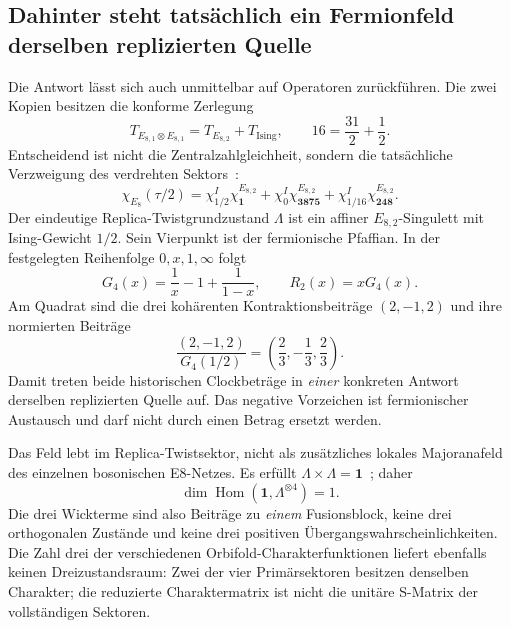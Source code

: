 \subsection{Dahinter steht tatsächlich ein Fermionfeld derselben replizierten Quelle}
Die Antwort lässt sich auch unmittelbar auf Operatoren zurückführen.
Die zwei Kopien besitzen die konforme Zerlegung
\begin{equation}
T_{E_{8,1}\otimes E_{8,1}}
=T_{E_{8,2}}+T_{\mathrm{Ising}},\qquad
16=\frac{31}{2}+\frac12.
\end{equation}
Entscheidend ist nicht die Zentralzahlgleichheit, sondern die tatsächliche Verzweigung des verdrehten Sektors~\cite{collazuolmelnikov}:
\begin{equation}
\chi_{E_8}(\tau/2)
=\chi^I_{1/2}\chi^{E_{8,2}}_{\mathbf1}
+\chi^I_0\chi^{E_{8,2}}_{\mathbf{3875}}
+\chi^I_{1/16}\chi^{E_{8,2}}_{\mathbf{248}}.
\end{equation}
Der eindeutige Replica-Twistgrundzustand $\Lambda$ ist ein affiner $E_{8,2}$-Singulett mit Ising-Gewicht $1/2$. Sein Vierpunkt ist der fermionische Pfaffian. In der festgelegten Reihenfolge $0,x,1,\infty$ folgt
\begin{equation}
G_4(x)=\frac1x-1+\frac1{1-x},\qquad R_2(x)=xG_4(x).
\end{equation}
Am Quadrat sind die drei kohärenten Kontraktionsbeiträge $(2,-1,2)$ und ihre normierten Beiträge
\begin{equation}\label{eq:replicaclockamplitudes}
\frac{(2,-1,2)}{G_4(1/2)}
=\left(\frac23,-\frac13,\frac23\right).
\end{equation}
Damit treten beide historischen Clockbeträge in \emph{einer} konkreten Antwort derselben replizierten Quelle auf. Das negative Vorzeichen ist fermionischer Austausch und darf nicht durch einen Betrag ersetzt werden.

Das Feld lebt im Replica-Twistsektor, nicht als zusätzliches lokales Majoranafeld des einzelnen bosonischen E8-Netzes.
Es erfüllt $\Lambda\times\Lambda=\mathbf1$~\cite{e8replica}; daher
\begin{equation}
\dim\operatorname{Hom}(\mathbf1,\Lambda^{\otimes4})=1.
\end{equation}
Die drei Wickterme sind also Beiträge zu \emph{einem} Fusionsblock, keine drei orthogonalen Zustände und keine drei positiven Übergangswahrscheinlichkeiten. Die Zahl drei der verschiedenen Orbifold-Charakterfunktionen liefert ebenfalls keinen Dreizustandsraum: Zwei der vier Primärsektoren besitzen denselben Charakter; die reduzierte Charaktermatrix ist nicht die unitäre S-Matrix der vollständigen Sektoren.

